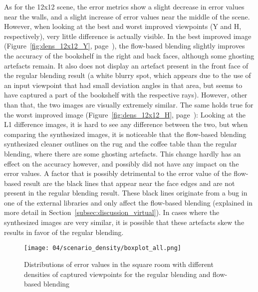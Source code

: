 As for the 12x12 scene, the error metrics show a slight decrease in error values near the walls, and a slight increase of error values near the middle of the scene. However, when looking at the best and worst improved viewpoints (Y and H, respectively), very little difference is actually visible.
In the best improved image (Figure~\ref{fig:dens_12x12_Y}, page~\pageref{fig:dens_12x12_Y}), the flow-based blending slightly improves the accuracy of the bookshelf in the right and back faces, although some ghosting artefacts remain. It also does not display an artefact present in the front face of the regular blending result (a white blurry spot, which appears due to the use of an input viewpoint that had small deviation angles in that area, but seems to have captured a part of the bookshelf with the respective rays). However, other than that, the two images are visually extremely similar.
The same holds true for the worst improved image (Figure~\ref{fig:dens_12x12_H}, page~\pageref{fig:dens_12x12_H}): Looking at the L1 difference images, it is hard to see any difference between the two, but when comparing the synthesized images, it is noticeable that the flow-based blending synthesized cleaner outlines on the rug and the coffee table than the regular blending, where there are some ghosting artefacts. This change hardly has an effect on the accuracy however, and possibly did not have any impact on the error values.
A factor that is possibly detrimental to the error value of the flow-based result are the black lines that appear near the face edges and are not present in the regular blending result. These black lines originate from a bug in one of the external libraries and only affect the flow-based blending (explained in more detail in Section~\ref{subsec:discussion_virtual}). In cases where the synthesized images are very similar, it is possible that these artefacts skew the results in favor of the regular blending.

\begin{figure}
		\centering
		\texttt{[image: 04/scenario\_density/boxplot\_all.png]}
		\caption[Distributions of all of the results with different densities]{Distributions of error values in the square room with different densities of captured viewpoints for the regular blending and flow-based blending}
		\label{fig:scenario_dens_boxplot}
\end{figure}


